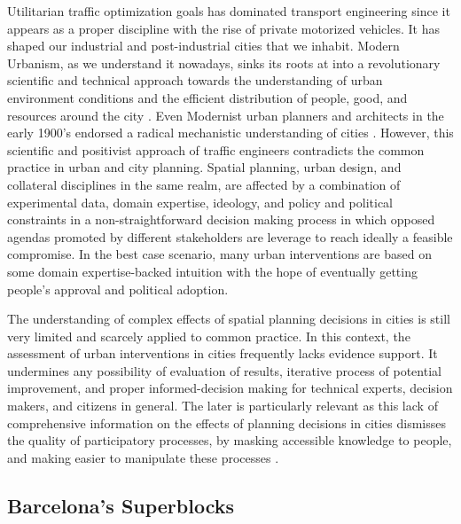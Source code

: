 \documentclass[11pt]{article}
\begin{document}
Utilitarian traffic optimization goals has dominated transport engineering since it appears as a proper discipline with the rise of private motorized vehicles. It has shaped our industrial and post-industrial cities that we inhabit. Modern Urbanism, as we understand it nowadays, sinks its roots at into a revolutionary scientific and technical approach towards the understanding of urban environment conditions and the efficient distribution of people, good, and resources around the city \citep{Cerda1867}. Even Modernist urban planners and architects in the early 1900's endorsed a radical mechanistic understanding of cities \citep{CIAM1933}. However, this scientific and positivist approach of traffic engineers contradicts the common practice in urban and city planning. Spatial planning, urban design, and collateral disciplines in the same realm, are affected by a combination of experimental data, domain expertise, ideology, and policy and political constraints in a non-straightforward decision making process in which opposed agendas promoted by different stakeholders are leverage to reach ideally a feasible compromise. In the best case scenario, many urban interventions are based on some domain expertise-backed intuition with the hope of eventually getting people's approval and political adoption.

The understanding of complex effects of spatial planning decisions in cities is still very limited and scarcely applied to common practice. In this context, the assessment of urban interventions in cities frequently lacks evidence support. It undermines any possibility of evaluation of results, iterative process of potential improvement, and proper informed-decision making for technical experts, decision makers, and citizens in general. The later is particularly relevant as this lack of comprehensive information on the effects of planning decisions in cities dismisses the quality of participatory processes, by masking accessible knowledge to people, and making easier to manipulate these processes \citep{Blundell-Jones2005, Plaza2020}.

\subsection {Barcelona's Superblocks}
\end{document}

